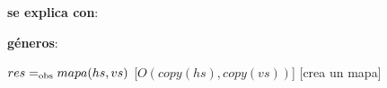 \begin{Interfaz}
  
    \textbf{se explica con}: 
  
    \textbf{géneros}: 
  
  
    {$res =_{\mathrm{obs}} mapa(hs, vs)$}%
      [$O(copy(hs), copy(vs))$]
    [crea un mapa]
  
      \completar
  
  \end{Interfaz}